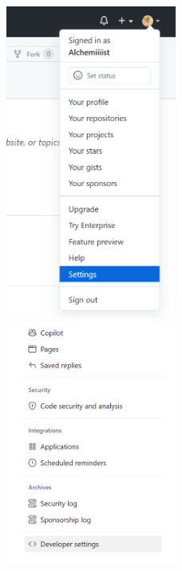 \begin{enumerate}
          \begin{figure}[ht]
              \begin{minipage}[c]{0.5\textwidth}
                  \centering
                  \includegraphics[width=0.5\textwidth]{image/git/github-token.png}
              \end{minipage}
              \begin{minipage}[c]{0.25\textwidth}
                  \centering
                  \includegraphics[width=0.5\textwidth]{image/git/github-token2.png}
              \end{minipage}


\end{figure}
\end{enumerate}
